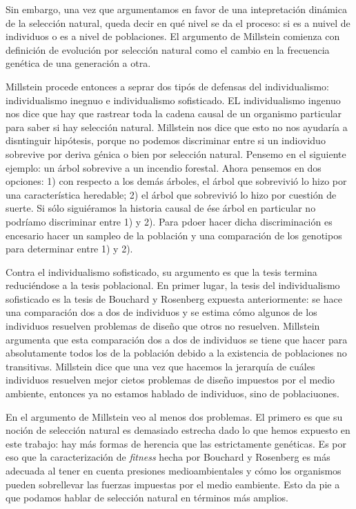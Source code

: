 Sin embargo, una vez que argumentamos en favor de una intepretación dinámica de la selección natural, queda decir en qué nivel se da el proceso: si es a nuivel de individuos o es a nivel de poblaciones. El argumento de Millstein comienza con definición de evolución por selección natural como el cambio en la frecuencia genética de una generación a otra.

Millstein procede entonces a seprar dos tipós de defensas del individualismo: individualismo inegnuo e individualismo sofisticado. EL individualismo ingenuo nos dice que hay que rastrear toda la cadena causal de un organismo particular para saber si hay selección natural. Millstein nos dice que esto no nos ayudaría a disntinguir hipótesis, porque no podemos discriminar entre si un indioviduo sobrevive por deriva génica o bien por selección natural. Pensemo en el siguiente ejemplo: un árbol sobrevive a un incendio forestal. Ahora pensemos en dos opciones: 1) con respecto a los demás árboles, el árbol que sobrevivió lo hizo por una característica heredable; 2) el árbol que sobrevivió lo hizo por cuestión de suerte. Si sólo siguiéramos la historia causal de ése árbol en particular no podríamo discriminar entre 1) y 2). Para pdoer hacer dicha discriminación es encesario hacer un sampleo de la población y una comparación de los genotipos para determinar entre 1) y 2).

Contra el individualismo sofisticado, su argumento es que la tesis termina reduciéndose a la tesis poblacional. En primer lugar, la tesis del individualismo sofisticado es la tesis de Bouchard y Rosenberg expuesta anteriormente: se hace una comparación dos a dos de individuos y se estima cómo algunos de los individuos resuelven problemas de diseño que otros no resuelven. Millstein argumenta que esta comparación dos a dos de individuos se tiene que hacer para absolutamente todos los de la población debido a la existencia de poblaciones no transitivas. Millstein dice que una vez que hacemos la jerarquía de cuáles individuos resuelven mejor cietos problemas de diseño impuestos por el medio ambiente, entonces ya no estamos hablado de individuos, sino de poblaciuones.

En el argumento de Millstein veo al menos dos problemas. El primero es que su noción de selección natural es demasiado estrecha dado lo que hemos expuesto en este trabajo: hay más formas de herencia que las estrictamente genéticas. Es por eso que la caracterización de \emph{fitness} hecha por Bouchard y Rosenberg es más adecuada al tener en cuenta presiones medioambientales y cómo los organismos pueden sobrellevar las fuerzas impuestas por el medio eambiente. Esto da pie a que podamos hablar de selección natural en términos más amplios.

